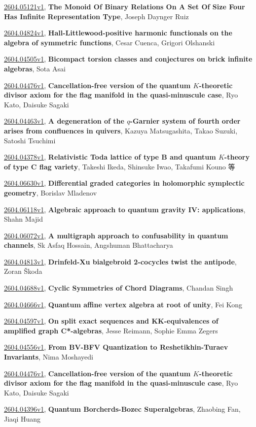 \documentclass[9pt, a4paper]{article}
\theoremstyle{plain}
\theoremstyle{definition}
\theoremstyle{remark}
\newcommand{\arxiv}[3]{\href{https://arxiv.org/abs/#1}{#1}, \textbf{\textcolor{arxivblue}{#2}}, #3}
\begin{document}
\arxiv{2604.05121v1}{The Monoid Of Binary Relations On A Set Of Size Four Has Infinite Representation Type}{Joseph Daynger Ruiz}

\arxiv{2604.04824v1}{Hall-Littlewood-positive harmonic functionals on the algebra of symmetric functions}{Cesar Cuenca, Grigori Olshanski}

\arxiv{2604.04505v1}{Bicompact torsion classes and conjectures on brick infinite algebras}{Sota Asai}

\arxiv{2604.04476v1}{Cancellation-free version of the quantum $K$-theoretic divisor axiom for the flag manifold in the quasi-minuscule case}{Ryo Kato, Daisuke Sagaki}

\arxiv{2604.04463v1}{A degeneration of the $q$-Garnier system of fourth order arises from confluences in quivers}{Kazuya Matsugashita, Takao Suzuki, Satoshi Tsuchimi}

\arxiv{2604.04378v1}{Relativistic Toda lattice of type B and quantum $K$-theory of type C flag variety}{Takeshi Ikeda, Shinsuke Iwao, Takafumi Kouno 等}

\arxiv{2604.06630v1}{Differential graded categories in holomorphic symplectic geometry}{Borislav Mladenov}

\arxiv{2604.06118v1}{Algebraic approach to quantum gravity IV: applications}{Shahn Majid}

\arxiv{2604.06072v1}{A multigraph approach to confusability in quantum channels}{Sk Asfaq Hossain, Angshuman Bhattacharya}

\arxiv{2604.04813v1}{Drinfeld-Xu bialgebroid 2-cocycles twist the antipode}{Zoran Škoda}

\arxiv{2604.04688v1}{Cyclic Symmetries of Chord Diagrams}{Chandan Singh}

\arxiv{2604.04666v1}{Quantum affine vertex algebra at root of unity}{Fei Kong}

\arxiv{2604.04597v1}{On split exact sequences and KK-equivalences of amplified graph C*-algebras}{Jesse Reimann, Sophie Emma Zegers}

\arxiv{2604.04556v1}{From BV-BFV Quantization to Reshetikhin-Turaev Invariants}{Nima Moshayedi}

\arxiv{2604.04476v1}{Cancellation-free version of the quantum $K$-theoretic divisor axiom for the flag manifold in the quasi-minuscule case}{Ryo Kato, Daisuke Sagaki}

\arxiv{2604.04396v1}{Quantum Borcherds-Bozec Superalgebras}{Zhaobing Fan, Jiaqi Huang}

\end{document}
